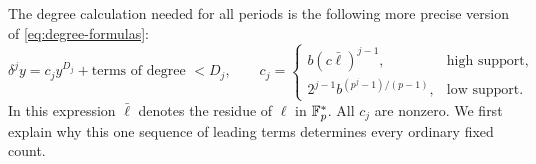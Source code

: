 The degree calculation needed for all periods is the following more
precise version of \eqref{eq:degree-formulas}:
\begin{equation}\label{eq:leading-claim}
 \delta^j y=c_jy^{D_j}+\text{terms of degree }<D_j,
 \qquad
 c_j=
 \begin{cases}
 b(c\bar\ell)^{j-1},&\text{high support},\\
 2^{j-1}b^{(p^j-1)/(p-1)},&\text{low support}.
 \end{cases}
\end{equation}
In this expression $\bar\ell$ denotes the residue of $\ell$ in
$\mathbb F_p^*$. All $c_j$ are nonzero. We first explain why this one
sequence of leading terms determines every ordinary fixed count.
